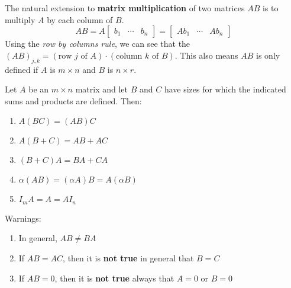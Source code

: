 \begin{definition}
The natural extension to \textbf{matrix multiplication} of two matrices $AB$ is to multiply $A$ by each column of $B$. 
$$AB = A \begin{bmatrix}
b_{1} & \cdots & b_{n}
\end{bmatrix} = \begin{bmatrix}
Ab_{1} & \cdots & Ab_{n}
\end{bmatrix}$$
Using the \textit{row by columns rule}, we can see that the $(AB)_{j,k} = (\text{row $j$ of $A$}) \cdot (\text{column $k$ of $B$})$. This also means $AB$ is only defined if $A$ is $m \times n$ and $B$ is $n \times r$. 

Let $A$ be an $m \times n$ matrix and let $B$ and $C$ have sizes for which the indicated sums and products are defined. Then:
\begin{enumerate}
	\item $A(BC) = (AB)C$
	\item $A(B + C) = AB + AC$
	\item $(B + C)A = BA + CA $
	\item $\alpha (AB) = (\alpha A)B = A(\alpha B)$
	\item $I_m A = A = AI_n$
\end{enumerate}
Warnings: 
\begin{enumerate}
	\item In general, $AB \neq BA$ 
	\item If $AB = AC$, then it is \textbf{not true} in general that $B=C$
	\item If $AB = 0$, then it is \textbf{not true} always that $A=0$ or $B=0$
\end{enumerate}
\end{definition}

